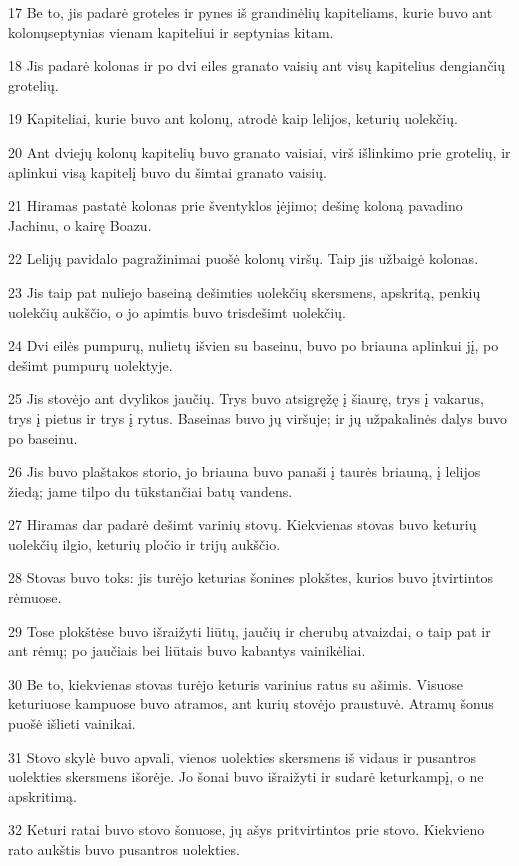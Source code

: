 \par 17 Be to, jis padarė groteles ir pynes iš grandinėlių kapiteliams, kurie buvo ant kolonų­septynias vienam kapiteliui ir septynias kitam. 
\par 18 Jis padarė kolonas ir po dvi eiles granato vaisių ant visų kapitelius dengiančių grotelių. 
\par 19 Kapiteliai, kurie buvo ant kolonų, atrodė kaip lelijos, keturių uolekčių. 
\par 20 Ant dviejų kolonų kapitelių buvo granato vaisiai, virš išlinkimo prie grotelių, ir aplinkui visą kapitelį buvo du šimtai granato vaisių. 
\par 21 Hiramas pastatė kolonas prie šventyklos įėjimo; dešinę koloną pavadino Jachinu, o kairę Boazu. 
\par 22 Lelijų pavidalo pagražinimai puošė kolonų viršų. Taip jis užbaigė kolonas. 
\par 23 Jis taip pat nuliejo baseiną dešimties uolekčių skersmens, apskritą, penkių uolekčių aukščio, o jo apimtis buvo trisdešimt uolekčių. 
\par 24 Dvi eilės pumpurų, nulietų išvien su baseinu, buvo po briauna aplinkui jį, po dešimt pumpurų uolektyje. 
\par 25 Jis stovėjo ant dvylikos jaučių. Trys buvo atsigręžę į šiaurę, trys į vakarus, trys į pietus ir trys į rytus. Baseinas buvo jų viršuje; ir jų užpakalinės dalys buvo po baseinu. 
\par 26 Jis buvo plaštakos storio, jo briauna buvo panaši į taurės briauną, į lelijos žiedą; jame tilpo du tūkstančiai batų vandens. 
\par 27 Hiramas dar padarė dešimt varinių stovų. Kiekvienas stovas buvo keturių uolekčių ilgio, keturių pločio ir trijų aukščio. 
\par 28 Stovas buvo toks: jis turėjo keturias šonines plokštes, kurios buvo įtvirtintos rėmuose. 
\par 29 Tose plokštėse buvo išraižyti liūtų, jaučių ir cherubų atvaizdai, o taip pat ir ant rėmų; po jaučiais bei liūtais buvo kabantys vainikėliai. 
\par 30 Be to, kiekvienas stovas turėjo keturis varinius ratus su ašimis. Visuose keturiuose kampuose buvo atramos, ant kurių stovėjo praustuvė. Atramų šonus puošė išlieti vainikai. 
\par 31 Stovo skylė buvo apvali, vienos uolekties skersmens iš vidaus ir pusantros uolekties skersmens išorėje. Jo šonai buvo išraižyti ir sudarė keturkampį, o ne apskritimą. 
\par 32 Keturi ratai buvo stovo šonuose, jų ašys pritvirtintos prie stovo. Kiekvieno rato aukštis buvo pusantros uolekties. 
